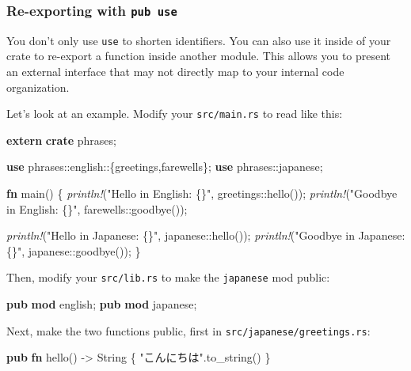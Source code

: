 \documentclass[a4paper,]{book}
\newenvironment{Shaded}{\begin{snugshade}}{\end{snugshade}}
\newcommand{\KeywordTok}[1]{\textcolor[rgb]{0.13,0.29,0.53}{\textbf{{#1}}}}
\newcommand{\DataTypeTok}[1]{\textcolor[rgb]{0.13,0.29,0.53}{{#1}}}
\newcommand{\StringTok}[1]{\textcolor[rgb]{0.31,0.60,0.02}{{#1}}}
\newcommand{\PreprocessorTok}[1]{\textcolor[rgb]{0.56,0.35,0.01}{\textit{{#1}}}}
\newcommand{\NormalTok}[1]{{#1}}
\begin{document}
\subsubsection{\texorpdfstring{Re-exporting with
\texttt{pub\ use}}{Re-exporting with pub use}}\label{re-exporting-with-pub-use}

You don't only use \texttt{use} to shorten identifiers. You can also use
it inside of your crate to re-export a function inside another module.
This allows you to present an external interface that may not directly
map to your internal code organization.

Let's look at an example. Modify your \texttt{src/main.rs} to read like
this:

\begin{Shaded}
\begin{Highlighting}[]
\KeywordTok{extern} \KeywordTok{crate} \NormalTok{phrases;}

\KeywordTok{use} \NormalTok{phrases::english::\{greetings,farewells\};}
\KeywordTok{use} \NormalTok{phrases::japanese;}

\KeywordTok{fn} \NormalTok{main() \{}
    \PreprocessorTok{println!}\NormalTok{(}\StringTok{"Hello in English: \{\}"}\NormalTok{, greetings::hello());}
    \PreprocessorTok{println!}\NormalTok{(}\StringTok{"Goodbye in English: \{\}"}\NormalTok{, farewells::goodbye());}

    \PreprocessorTok{println!}\NormalTok{(}\StringTok{"Hello in Japanese: \{\}"}\NormalTok{, japanese::hello());}
    \PreprocessorTok{println!}\NormalTok{(}\StringTok{"Goodbye in Japanese: \{\}"}\NormalTok{, japanese::goodbye());}
\NormalTok{\}}
\end{Highlighting}
\end{Shaded}

Then, modify your \texttt{src/lib.rs} to make the \texttt{japanese} mod
public:

\begin{Shaded}
\begin{Highlighting}[]
\KeywordTok{pub} \KeywordTok{mod} \NormalTok{english;}
\KeywordTok{pub} \KeywordTok{mod} \NormalTok{japanese;}
\end{Highlighting}
\end{Shaded}

Next, make the two functions public, first in
\texttt{src/japanese/greetings.rs}:

\begin{Shaded}
\begin{Highlighting}[]
\KeywordTok{pub} \KeywordTok{fn} \NormalTok{hello() -> }\DataTypeTok{String} \NormalTok{\{}
    \StringTok{"こんにちは"}\NormalTok{.to_string()}
\NormalTok{\}}
\end{Highlighting}
\end{Shaded}
\end{document}
